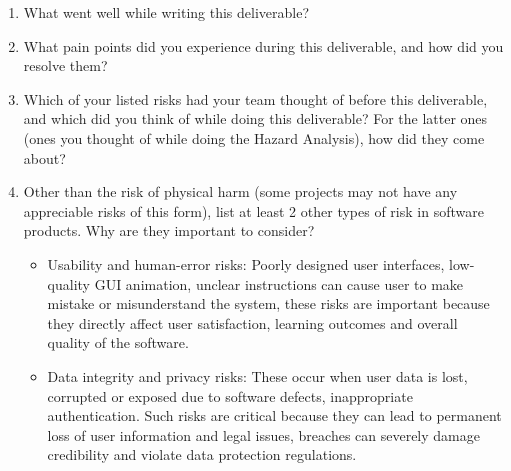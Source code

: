 \documentclass{article}
\begin{document}
\begin{enumerate}
    \item What went well while writing this deliverable? 
    \item What pain points did you experience during this deliverable, and how
    did you resolve them?
    \item Which of your listed risks had your team thought of before this
    deliverable, and which did you think of while doing this deliverable? For
    the latter ones (ones you thought of while doing the Hazard Analysis), how
    did they come about?
    \item Other than the risk of physical harm (some projects may not have any
    appreciable risks of this form), list at least 2 other types of risk in
    software products. Why are they important to consider? 
	\begin{itemize}
	\item Usability and human-error risks: Poorly designed user interfaces, low-quality GUI animation, unclear instructions can cause user to make mistake or misunderstand the system, these risks are important because they directly affect user satisfaction, learning outcomes and overall quality of the software.
	\item Data integrity and privacy risks: These occur when user data is lost, corrupted or exposed due to software defects, inappropriate authentication. Such risks are critical because they can lead to permanent loss of user information and legal issues, breaches can severely damage credibility and violate data protection regulations.
	
	\end{itemize}
\end{enumerate}
\end{document}
